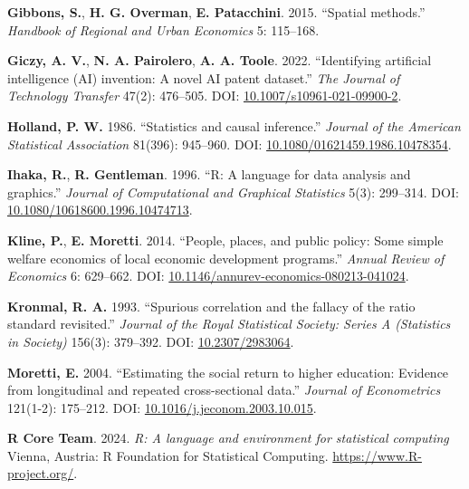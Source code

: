 \documentclass[
]{article}
\newlength{\cslhangindent}
\newenvironment{CSLReferences}[2] %
 {\begin{list}{}{%
  \setlength{\itemindent}{0pt}
  \setlength{\leftmargin}{0pt}
  \setlength{\parsep}{0pt}
  \ifodd #1
   \setlength{\leftmargin}{\cslhangindent}
   \setlength{\itemindent}{-1\cslhangindent}
  \fi
  \setlength{\itemsep}{#2\baselineskip}}}
 {\end{list}}
\begin{document}
\begin{CSLReferences}{1}{0}
\textbf{Gibbons, S.}, \textbf{H. G. Overman}, \textbf{E. Patacchini}.
2015. {``Spatial methods.''} \emph{Handbook of Regional and Urban
Economics} 5: 115--168.

\textbf{Giczy, A. V.}, \textbf{N. A. Pairolero}, \textbf{A. A. Toole}.
2022. {``Identifying artificial intelligence ({AI}) invention: A novel
{AI} patent dataset.''} \emph{The Journal of Technology Transfer} 47(2):
476--505. DOI:
\href{https://doi.org/10.1007/s10961-021-09900-2}{10.1007/s10961-021-09900-2}.

\textbf{Holland, P. W.} 1986. {``Statistics and causal inference.''}
\emph{Journal of the American Statistical Association} 81(396):
945--960. DOI:
\href{https://doi.org/10.1080/01621459.1986.10478354}{10.1080/01621459.1986.10478354}.

\textbf{Ihaka, R.}, \textbf{R. Gentleman}. 1996. {``R: A language for
data analysis and graphics.''} \emph{Journal of Computational and
Graphical Statistics} 5(3): 299--314. DOI:
\href{https://doi.org/10.1080/10618600.1996.10474713}{10.1080/10618600.1996.10474713}.

\textbf{Kline, P.}, \textbf{E. Moretti}. 2014. {``People, places, and
public policy: Some simple welfare economics of local economic
development programs.''} \emph{Annual Review of Economics} 6: 629--662.
DOI:
\href{https://doi.org/10.1146/annurev-economics-080213-041024}{10.1146/annurev-economics-080213-041024}.

\textbf{Kronmal, R. A.} 1993. {``Spurious correlation and the fallacy of
the ratio standard revisited.''} \emph{Journal of the Royal Statistical
Society: Series A (Statistics in Society)} 156(3): 379--392. DOI:
\href{https://doi.org/10.2307/2983064}{10.2307/2983064}.

\textbf{Moretti, E.} 2004. {``Estimating the social return to higher
education: Evidence from longitudinal and repeated cross-sectional
data.''} \emph{Journal of Econometrics} 121(1-2): 175--212. DOI:
\href{https://doi.org/10.1016/j.jeconom.2003.10.015}{10.1016/j.jeconom.2003.10.015}.

\textbf{R Core Team}. 2024. \emph{R: A language and environment for
statistical computing} Vienna, Austria: R Foundation for Statistical
Computing. \url{https://www.R-project.org/}.


\end{CSLReferences}
\end{document}
